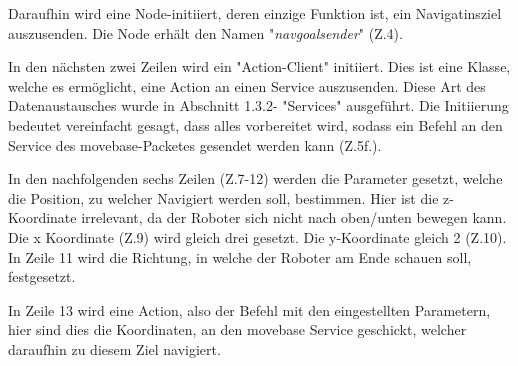 {{{		 	Daraufhin wird eine Node-initiiert, deren einzige Funktion ist, ein Navigatinsziel auszusenden. Die Node erhält den Namen "\textit{nav\textunderscore goal\textunderscore sender}" (Z.4).
		 	
		 	In den nächsten zwei Zeilen wird ein "Action-Client" \space initiiert. Dies ist eine Klasse, welche es ermöglicht, eine Action an einen Service auszusenden. Diese Art des Datenaustausches wurde in Abschnitt 1.3.2- "Services" ausgeführt. Die Initiierung bedeutet vereinfacht gesagt, dass alles vorbereitet wird, sodass ein Befehl an den Service des move\textunderscore base-Packetes gesendet werden kann (Z.5f.).
		 	
		 	In den nachfolgenden sechs Zeilen (Z.7-12) werden die Parameter gesetzt, welche die Position, zu welcher Navigiert werden soll, bestimmen. Hier ist die z-Koordinate irrelevant, da der Roboter sich nicht nach oben/unten bewegen kann. Die x Koordinate (Z.9) wird gleich drei gesetzt. Die y-Koordinate gleich 2 (Z.10). In Zeile 11 wird die Richtung, in welche der Roboter am Ende schauen soll, festgesetzt.
		 	
		 	In Zeile 13 wird eine Action, also der Befehl mit den eingestellten Parametern, hier sind dies die Koordinaten, an den move\textunderscore base Service geschickt, welcher daraufhin zu diesem Ziel navigiert.
		 	
		 	
			
		}
	}
}